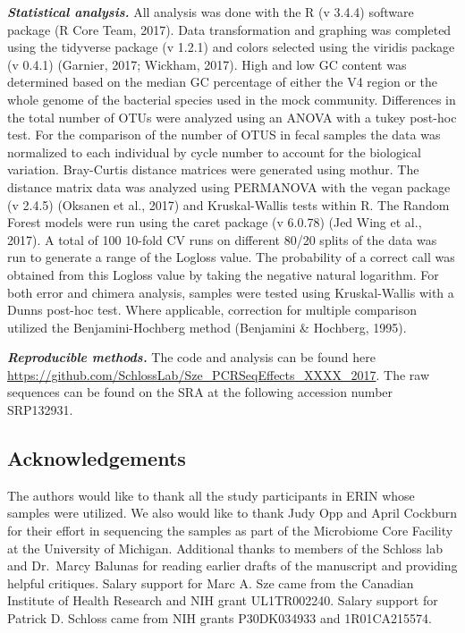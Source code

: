 \documentclass[11pt,]{article}
\begin{document}
\textbf{\emph{Statistical analysis.}} All analysis was done with the R
(v 3.4.4) software package (R Core Team, 2017). Data transformation and
graphing was completed using the tidyverse package (v 1.2.1) and colors
selected using the viridis package (v 0.4.1) (Garnier, 2017; Wickham,
2017). High and low GC content was determined based on the median GC
percentage of either the V4 region or the whole genome of the bacterial
species used in the mock community. Differences in the total number of
OTUs were analyzed using an ANOVA with a tukey post-hoc test. For the
comparison of the number of OTUS in fecal samples the data was
normalized to each individual by cycle number to account for the
biological variation. Bray-Curtis distance matrices were generated using
mothur. The distance matrix data was analyzed using PERMANOVA with the
vegan package (v 2.4.5) (Oksanen et al., 2017) and Kruskal-Wallis tests
within R. The Random Forest models were run using the caret package (v
6.0.78) (Jed Wing et al., 2017). A total of 100 10-fold CV runs on
different 80/20 splits of the data was run to generate a range of the
Logloss value. The probability of a correct call was obtained from this
Logloss value by taking the negative natural logarithm. For both error
and chimera analysis, samples were tested using Kruskal-Wallis with a
Dunns post-hoc test. Where applicable, correction for multiple
comparison utilized the Benjamini-Hochberg method (Benjamini \&
Hochberg, 1995).

\textbf{\emph{Reproducible methods.}} The code and analysis can be found
here \url{https://github.com/SchlossLab/Sze_PCRSeqEffects_XXXX_2017}.
The raw sequences can be found on the SRA at the following accession
number SRP132931.

\newpage

\subsection{Acknowledgements}\label{acknowledgements}

The authors would like to thank all the study participants in ERIN whose
samples were utilized. We also would like to thank Judy Opp and April
Cockburn for their effort in sequencing the samples as part of the
Microbiome Core Facility at the University of Michigan. Additional
thanks to members of the Schloss lab and Dr.~Marcy Balunas for reading
earlier drafts of the manuscript and providing helpful critiques. Salary
support for Marc A. Sze came from the Canadian Institute of Health
Research and NIH grant UL1TR002240. Salary support for Patrick D.
Schloss came from NIH grants P30DK034933 and 1R01CA215574.
\end{document}
